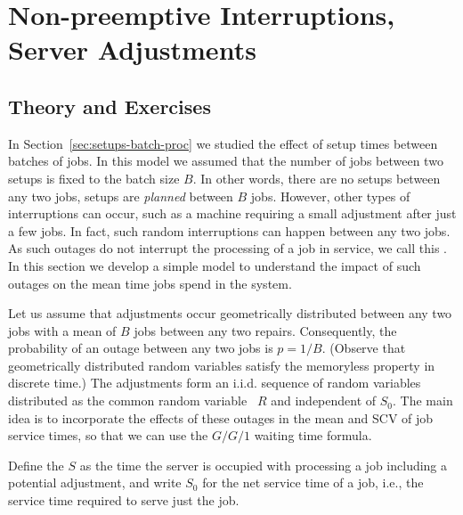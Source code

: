 \section{Non-preemptive Interruptions, Server Adjustments}
\label{sec:non-preempt-interr}

\subsection*{Theory and Exercises}




In Section~\ref{sec:setups-batch-proc} we studied the effect of setup times between batches of jobs.
In this model we assumed that the number of jobs between two setups is fixed to the batch size $B$.
In other words, there are no setups between any two jobs, setups are \emph{planned} between $B$ jobs.
However, other types of interruptions can occur, such as a machine requiring a small adjustment after just a few jobs.
In fact, such random interruptions can happen between any two jobs.
As such outages do not interrupt the processing of a job in service,  we call this .
In this section we develop a simple model to understand the impact of such outages on the mean time jobs spend in the system.

Let us assume that adjustments occur geometrically distributed between any two jobs with a mean of $B$ jobs between any two repairs.
Consequently, the probability of an outage between any two jobs is $p=1/B$.
(Observe that geometrically distributed random variables satisfy the memoryless property in discrete time.)
The adjustments form an i.i.d.
sequence of random variables distributed as the common random variable ~$R$ and independent of $S_0$.
The main idea is to incorporate the effects of these outages in the mean and SCV of job service times, so that we can use the $G/G/1$ waiting time formula.

Define the  $S$ as the time the server is occupied with processing a job including a potential adjustment, and write $S_0$ for the net service time of a job, i.e., the service time required to serve just the job.

